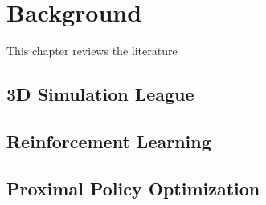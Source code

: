 \chapter{Background}
\label{cap:Background}



This chapter reviews the literature

\section{3D Simulation League}
\section{Reinforcement Learning}
\section{Proximal Policy Optimization}


